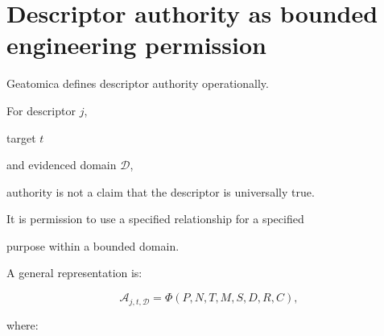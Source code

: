 \documentclass[11pt,a4paper,oneside]{report}
\begin{document}
\section{Descriptor authority as bounded engineering permission}



Geatomica defines descriptor authority operationally.



For descriptor $j$,

target $t$

and evidenced domain $\mathcal{D}$,

authority is not a claim that the descriptor is universally true.



It is permission to use a specified relationship for a specified

purpose within a bounded domain.



A general representation is:



\begin{equation}
\label{eq:authority-general}
\mathcal{A}_{j,t,\mathcal{D}}
=
\Phi
\left(
P,
N,
T,
M,
S,
D,
R,
C
\right),
\end{equation}



where:
\end{document}
